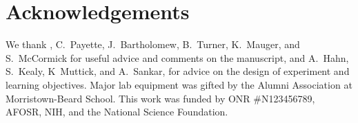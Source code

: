 \documentclass[aps,prl,preprint]{revtex4-1}
\begin{document}
\section{Acknowledgements}
We thank , C.~Payette, J.~Bartholomew, B.~Turner, K.~Mauger, and S.~McCormick for useful advice and comments on the manuscript, and A.~Hahn, S.~Kealy, K~Muttick, and A.~Sankar, for advice on the design of experiment and learning objectives. Major lab equipment was gifted by the Alumni Association at Morristown-Beard School. This work was funded by ONR \#N123456789, AFOSR, NIH, and the National Science Foundation. 

\end{document}
